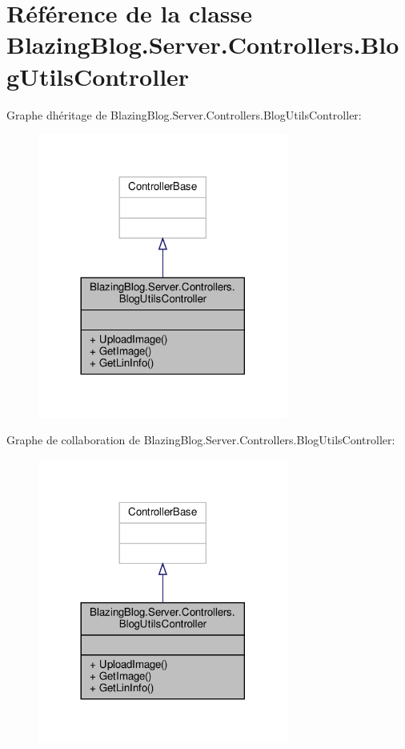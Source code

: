 \hypertarget{class_blazing_blog_1_1_server_1_1_controllers_1_1_blog_utils_controller}{}\section{Référence de la classe Blazing\+Blog.\+Server.\+Controllers.\+Blog\+Utils\+Controller}
\label{class_blazing_blog_1_1_server_1_1_controllers_1_1_blog_utils_controller}


Graphe d\textquotesingle{}héritage de Blazing\+Blog.\+Server.\+Controllers.\+Blog\+Utils\+Controller\+:\nopagebreak
\begin{figure}[H]
\begin{center}
\leavevmode
\includegraphics[width=233pt]{class_blazing_blog_1_1_server_1_1_controllers_1_1_blog_utils_controller__inherit__graph}
\end{center}
\end{figure}


Graphe de collaboration de Blazing\+Blog.\+Server.\+Controllers.\+Blog\+Utils\+Controller\+:\nopagebreak
\begin{figure}[H]
\begin{center}
\leavevmode
\includegraphics[width=233pt]{class_blazing_blog_1_1_server_1_1_controllers_1_1_blog_utils_controller__coll__graph}
\end{center}
\end{figure}
